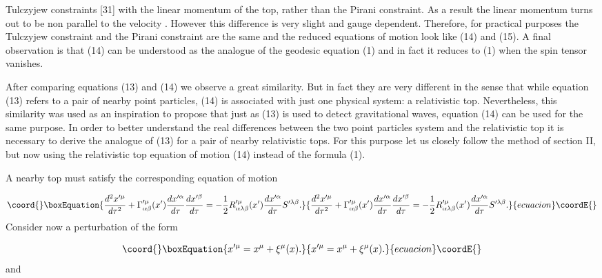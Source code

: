 \documentclass[a4paper,12pt]{article}
\begin{document}
Tulczyjew constraints [31] \coordHE{} with \coordHE{} the
linear momentum of the top, rather than the Pirani constraint. As a result
the linear momentum \coordHE{} turns out to be non parallel to the velocity \coordHE{}. However this difference is very slight
and gauge dependent. Therefore, for practical purposes the Tulczyjew
constraint and the Pirani constraint are the same and the reduced equations
of motion look like (14) and (15). A final observation is that (14) can be
understood as the analogue of the geodesic equation (1) and in fact it
reduces to (1) when the spin tensor \coordHE{} vanishes.

After comparing equations (13) and (14) we observe a great similarity. But
in fact they are very different in the sense that while equation (13) refers
to a pair of nearby point particles, (14) is associated with just one
physical system: a relativistic top. Nevertheless, this similarity was used
as an inspiration to propose that just as (13) is used to detect
gravitational waves, equation (14) can be used for the same purpose. In
order to better understand the real differences between the two point
particles system and the relativistic top it is necessary to derive the
analogue of (13) for a pair of nearby relativistic tops. For this purpose
let us closely follow the method of section II, but now using the
relativistic top equation of motion (14) instead of the formula (1).

A nearby top must satisfy the corresponding equation of motion

\begin{equation}\coord{}\boxEquation{
\frac{d^{2}x^{\prime\mu}}{d\tau^{2}}+\Gamma_{\alpha\beta}^{\prime\mu
}(x^{\prime})\frac{dx^{\prime\alpha}}{d\tau}\frac{dx^{\prime\beta}}{d\tau }=-
\frac{1}{2}R_{\alpha\lambda\beta}^{\prime\mu}(x^{\prime})\frac
{dx^{\prime\alpha}}{d\tau}S^{\prime\lambda\beta}.  \label{16}
}{
\frac{d^{2}x^{\prime\mu}}{d\tau^{2}}+\Gamma_{\alpha\beta}^{\prime\mu
}(x^{\prime})\frac{dx^{\prime\alpha}}{d\tau}\frac{dx^{\prime\beta}}{d\tau }=-
\frac{1}{2}R_{\alpha\lambda\beta}^{\prime\mu}(x^{\prime})\frac
{dx^{\prime\alpha}}{d\tau}S^{\prime\lambda\beta}.  }{ecuacion}\coordE{}\end{equation}
Consider now a perturbation of the form

\begin{equation}\coord{}\boxEquation{
x^{\prime\mu}=x^{\mu}+\xi^{\mu}(x).  \label{17}
}{
x^{\prime\mu}=x^{\mu}+\xi^{\mu}(x).  }{ecuacion}\coordE{}\end{equation}
and
\end{document}
